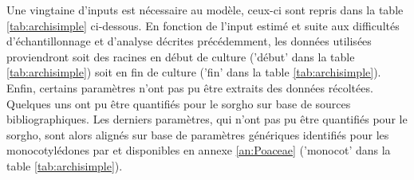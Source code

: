 Une vingtaine d'inputs est nécessaire au modèle, ceux-ci sont repris dans la table \ref{tab:archisimple} ci-dessous.
En fonction de l'input estimé et suite aux difficultés d'échantillonnage et d'analyse décrites précédemment, les données utilisées proviendront soit des racines en début de culture ('début' dans la table \ref{tab:archisimple}) soit en fin de culture ('fin' dans la table \ref{tab:archisimple}).
Enfin, certains paramètres n'ont pas pu être extraits des données récoltées.
Quelques uns ont pu être quantifiés pour le sorgho sur base de sources bibliographiques.
Les derniers paramètres, qui n'ont pas pu être quantifiés pour le sorgho, sont alors alignés sur base de paramètres génériques identifiés pour les monocotylédones par \cite{gerard_modelling_2017} et disponibles en annexe \ref{an:Poaceae} ('monocot' dans la table \ref{tab:archisimple}).

\newpage 

